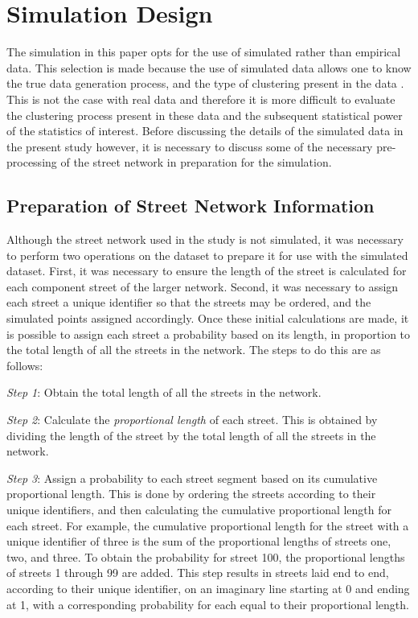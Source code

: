 \documentclass[12pt, letterpaper]{article}
\begin{document}
\section{Simulation Design}
The simulation in this paper opts for the use of simulated rather than empirical data. This selection is made because the use of simulated data allows one to know the true data generation process, and the type of clustering present in the data  \citep{kulldorff2006cancer}. This is not the case with real data and therefore it is more difficult to evaluate the clustering process present in these data \citep{kulldorff2006cancer} and the subsequent statistical power of the statistics of interest. Before discussing the details of the simulated data in the present study however, it is necessary to discuss some of the necessary pre-processing of the street network in preparation for the simulation.

\subsection{Preparation of Street Network Information}
Although the street network used in the study is not simulated, it was necessary to perform two operations on the dataset to prepare it for use with the simulated dataset. First, it was necessary to ensure the length of the street is calculated for each component street of the larger network. Second, it was necessary to assign each street a unique identifier so that the streets may be ordered, and the simulated points assigned accordingly. Once these initial calculations are made, it is possible to assign each street a probability based on its length, in proportion to the total length of all the streets in the network. The steps to do this are as follows:

\emph{Step 1}: Obtain the total length of all the streets in the network.

\emph{Step 2}: Calculate the \emph{proportional length} of each street. This is obtained by dividing the length of the street by the total length of all the streets in the network.

\emph{Step 3}: Assign a probability to each street segment based on its cumulative proportional length. This is done by ordering the streets according to their unique identifiers, and then calculating the cumulative proportional length for each street. For example, the cumulative proportional length for the street with a unique identifier of three is the sum of the proportional lengths of streets one, two, and three. To obtain the probability for street 100, the proportional lengths of streets 1 through 99 are added. This step results in streets laid end to end, according to their unique identifier, on an imaginary line starting at 0 and ending at 1, with a corresponding probability for each equal to their proportional length.
\end{document}
